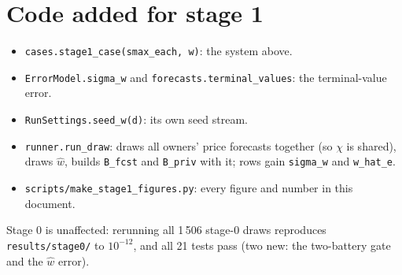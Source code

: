 \documentclass[10pt,a4paper]{article}
\newcommand{\code}[1]{\texttt{#1}}
\newcommand{\what}{\hat w}
\begin{document}
\section{Code added for stage 1}
\begin{itemize}
  \item \code{cases.stage1\_case(smax\_each, w)}: the system above.
  \item \code{ErrorModel.sigma\_w} and \code{forecasts.terminal\_values}: the terminal-value error.
  \item \code{RunSettings.seed\_w(d)}: its own seed stream.
  \item \code{runner.run\_draw}: draws all owners' price forecasts together (so $\chi$ is shared), draws
    $\what$, builds \code{B\_fcst} and \code{B\_priv} with it; rows gain \code{sigma\_w} and \code{w\_hat\_e}.
  \item \code{scripts/make\_stage1\_figures.py}: every figure and number in this document.
\end{itemize}
Stage 0 is unaffected: rerunning all 1\,506 stage-0 draws reproduces \code{results/stage0/} to $10^{-12}$, and
all 21 tests pass (two new: the two-battery gate and the $\what$ error).
\end{document}
